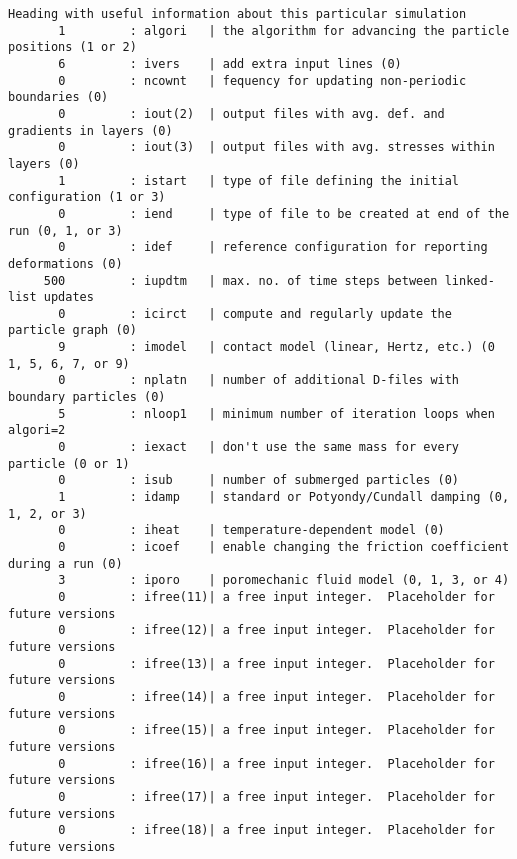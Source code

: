 \begin{verbatim}
Heading with useful information about this particular simulation
       1         : algori   | the algorithm for advancing the particle positions (1 or 2)
       6         : ivers    | add extra input lines (0)
       0         : ncownt   | fequency for updating non-periodic boundaries (0)
       0         : iout(2)  | output files with avg. def. and gradients in layers (0)
       0         : iout(3)  | output files with avg. stresses within layers (0)
       1         : istart   | type of file defining the initial configuration (1 or 3)
       0         : iend     | type of file to be created at end of the run (0, 1, or 3)
       0         : idef     | reference configuration for reporting deformations (0)
     500         : iupdtm   | max. no. of time steps between linked-list updates
       0         : icirct   | compute and regularly update the particle graph (0)
       9         : imodel   | contact model (linear, Hertz, etc.) (0 1, 5, 6, 7, or 9)
       0         : nplatn   | number of additional D-files with boundary particles (0)
       5         : nloop1   | minimum number of iteration loops when algori=2
       0         : iexact   | don't use the same mass for every particle (0 or 1)
       0         : isub     | number of submerged particles (0)
       1         : idamp    | standard or Potyondy/Cundall damping (0, 1, 2, or 3)
       0         : iheat    | temperature-dependent model (0)
       0         : icoef    | enable changing the friction coefficient during a run (0)
       3         : iporo    | poromechanic fluid model (0, 1, 3, or 4)
       0         : ifree(11)| a free input integer.  Placeholder for future versions
       0         : ifree(12)| a free input integer.  Placeholder for future versions
       0         : ifree(13)| a free input integer.  Placeholder for future versions
       0         : ifree(14)| a free input integer.  Placeholder for future versions
       0         : ifree(15)| a free input integer.  Placeholder for future versions
       0         : ifree(16)| a free input integer.  Placeholder for future versions
       0         : ifree(17)| a free input integer.  Placeholder for future versions
       0         : ifree(18)| a free input integer.  Placeholder for future versions
\end{verbatim}
